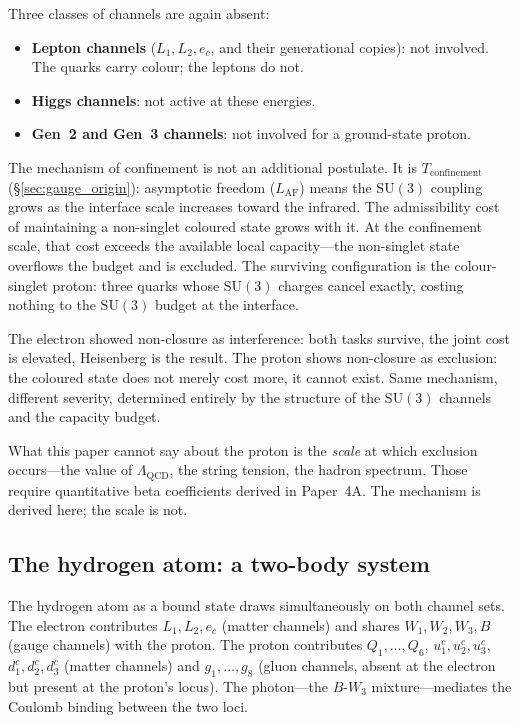 \documentclass[11pt]{article}
\newenvironment{varlist}{\begin{itemize}[nosep,leftmargin=2em]}{\end{itemize}}
\newcommand{\SU}{\mathrm{SU}}
\begin{document}
Three classes of channels are again absent:
\begin{varlist}
\item \textbf{Lepton channels} ($L_1, L_2, e_c$, and their generational
copies): not involved.  The quarks carry colour; the leptons do not.
\item \textbf{Higgs channels}: not active at these energies.
\item \textbf{Gen~2 and Gen~3 channels}: not involved for a
ground-state proton.
\end{varlist}

The mechanism of confinement is not an additional postulate.  It is
$T_{\mathrm{confinement}}$ (\S\ref{sec:gauge_origin}): asymptotic freedom
($L_{\mathrm{AF}}$) means the $\SU(3)$ coupling grows as the interface
scale increases toward the infrared.  The admissibility cost of maintaining
a non-singlet coloured state grows with it.  At the confinement scale, that
cost exceeds the available local capacity---the non-singlet state overflows
the budget and is excluded.  The surviving configuration is the
colour-singlet proton: three quarks whose $\SU(3)$ charges cancel exactly,
costing nothing to the $\SU(3)$ budget at the interface.

The electron showed non-closure as interference: both tasks survive, the
joint cost is elevated, Heisenberg is the result.  The proton shows
non-closure as exclusion: the coloured state does not merely cost more, it
cannot exist.  Same mechanism, different severity, determined entirely by
the structure of the $\SU(3)$ channels and the capacity budget.

What this paper cannot say about the proton is the \emph{scale} at which
exclusion occurs---the value of $\Lambda_{\mathrm{QCD}}$, the string
tension, the hadron spectrum.  Those require quantitative beta
coefficients derived in Paper~4A.  The mechanism is derived here; the
scale is not.

\subsection*{The hydrogen atom: a two-body system}

The hydrogen atom as a bound state draws simultaneously on both channel
sets.  The electron contributes $L_1, L_2, e_c$ (matter channels) and
shares $W_1, W_2, W_3, B$ (gauge channels) with the proton.  The proton
contributes $Q_1,\ldots,Q_6$, $u^c_1, u^c_2, u^c_3$, $d^c_1, d^c_2,
d^c_3$ (matter channels) and $g_1,\ldots,g_8$ (gluon channels, absent
at the electron but present at the proton's locus).  The photon---the
$B$-$W_3$ mixture---mediates the Coulomb binding between the two loci.
\end{document}
